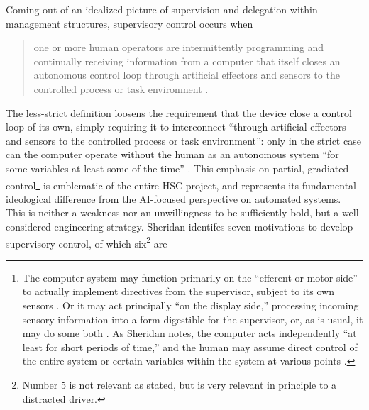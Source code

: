 
Coming out of an idealized picture of supervision and delegation
within management structures, supervisory control occurs when
\begin{quote}one or more human operators are intermittently
  programming and continually receiving information from a computer
  that itself closes an autonomous control loop through artificial
  effectors and sensors to the controlled process or task
  environment \cite[p. 1]{sheridan}.\end{quote}
The less-strict definition loosens the requirement that the device
close a control loop of its own, simply requiring it to interconnect
``through artificial effectors and sensors to the controlled process
or task environment'':  only in the strict case can the computer
operate without the human as an autonomous system ``for some
variables at least some of the time'' \cite[p. 1]{sheridan}. This
emphasis on partial, gradiated control\footnote{The computer system
  may function primarily on the ``efferent or motor side'' to actually
implement directives from the supervisor, subject to its own
sensors \cite[p. 3]{sheridan}. Or it may act principally ``on the
display side,'' processing incoming sensory information into a form
digestible for the supervisor, or, as is usual, it may do some
both \cite[p. 3]{sheridan}. As Sheridan notes, the computer acts
independently ``at least for short periods of time,'' and the human
may assume direct control of the entire system or certain variables
within the system at various points \cite[p. 3]{sheridan}.} is
emblematic of the entire HSC 
project, and represents its fundamental ideological difference from
the AI-focused perspective on automated systems. This is neither a
weakness nor an unwillingness to be sufficiently bold, but a
well-considered engineering strategy. Sheridan identifes seven
motivations to develop supervisory control, of which
six\footnote{Number 5 is not relevant as stated, but is very relevant
  in principle to a distracted driver.} are
